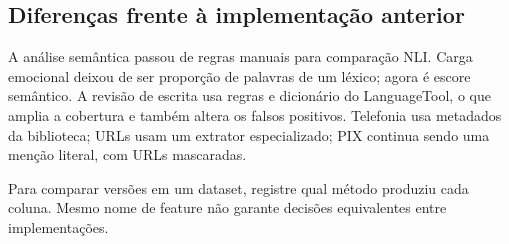 \subsection{Diferenças frente à implementação anterior}
A análise semântica passou de regras manuais para comparação NLI. Carga emocional deixou de ser proporção de palavras de um léxico; agora é escore semântico. A revisão de escrita usa regras e dicionário do LanguageTool, o que amplia a cobertura e também altera os falsos positivos. Telefonia usa metadados da biblioteca; URLs usam um extrator especializado; PIX continua sendo uma menção literal, com URLs mascaradas.

Para comparar versões em um dataset, registre qual método produziu cada coluna. Mesmo nome de feature não garante decisões equivalentes entre implementações.
